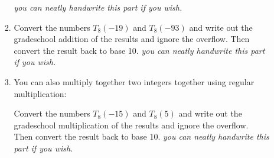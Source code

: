 \documentclass[10pt,letterpaper,unboxed,cm]{article}
\begin{document}
\begin{enumerate}
\begin{enumerate}
\begin{enumerate}
			                  \emph{you can neatly handwrite this part if you wish.}
			            \item
			                  Convert the numbers $T_8(-19)$ and $T_8(-93)$ and write out the gradeschool addition of the results and ignore the overflow. Then convert the result back to base 10.
			                  \emph{you can neatly handwrite this part if you wish.}

			            \item
			                  You can also multiply together two integers together using regular multiplication:

			                  Convert the numbers $T_8(-15)$ and $T_8(5)$ and write out the gradeschool multiplication of the results and ignore the overflow. Then convert the result back to base 10.
			                  \emph{you can neatly handwrite this part if you wish.}


		            \end{enumerate}


	      \end{enumerate}
\end{enumerate}
\end{document}
